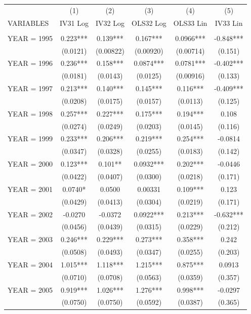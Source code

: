 \begin{tabular}{lccccc} \hline
 & (1) & (2) & (3) & (4) & (5) \\
VARIABLES & IV31 Log & IV32 Log & OLS32 Log & OLS33 Lin & IV33 Lin \\ \hline
 &  &  &  &  &  \\
YEAR = 1995 & 0.223*** & 0.139*** & 0.167*** & 0.0966*** & -0.848*** \\
 & (0.0121) & (0.00822) & (0.00920) & (0.00714) & (0.151) \\
YEAR = 1996 & 0.236*** & 0.158*** & 0.0874*** & 0.0781*** & -0.402*** \\
 & (0.0181) & (0.0143) & (0.0125) & (0.00916) & (0.133) \\
YEAR = 1997 & 0.213*** & 0.140*** & 0.145*** & 0.116*** & -0.409*** \\
 & (0.0208) & (0.0175) & (0.0157) & (0.0113) & (0.125) \\
YEAR = 1998 & 0.257*** & 0.227*** & 0.175*** & 0.194*** & 0.108 \\
 & (0.0274) & (0.0249) & (0.0203) & (0.0145) & (0.116) \\
YEAR = 1999 & 0.233*** & 0.206*** & 0.219*** & 0.254*** & -0.0814 \\
 & (0.0347) & (0.0328) & (0.0255) & (0.0183) & (0.142) \\
YEAR = 2000 & 0.123*** & 0.101** & 0.0932*** & 0.202*** & -0.0446 \\
 & (0.0422) & (0.0407) & (0.0300) & (0.0218) & (0.171) \\
YEAR = 2001 & 0.0740* & 0.0500 & 0.00331 & 0.109*** & 0.123 \\
 & (0.0429) & (0.0413) & (0.0304) & (0.0219) & (0.171) \\
YEAR = 2002 & -0.0270 & -0.0372 & 0.0922*** & 0.213*** & -0.632*** \\
 & (0.0456) & (0.0439) & (0.0315) & (0.0229) & (0.212) \\
YEAR = 2003 & 0.246*** & 0.229*** & 0.273*** & 0.358*** & 0.242 \\
 & (0.0508) & (0.0493) & (0.0347) & (0.0255) & (0.203) \\
YEAR = 2004 & 1.015*** & 1.118*** & 1.215*** & 0.875*** & 0.0913 \\
 & (0.0710) & (0.0708) & (0.0563) & (0.0359) & (0.357) \\
YEAR = 2005 & 0.919*** & 1.026*** & 1.276*** & 0.998*** & -0.0297 \\
 & (0.0750) & (0.0750) & (0.0592) & (0.0387) & (0.365) \\

\end{tabular}
